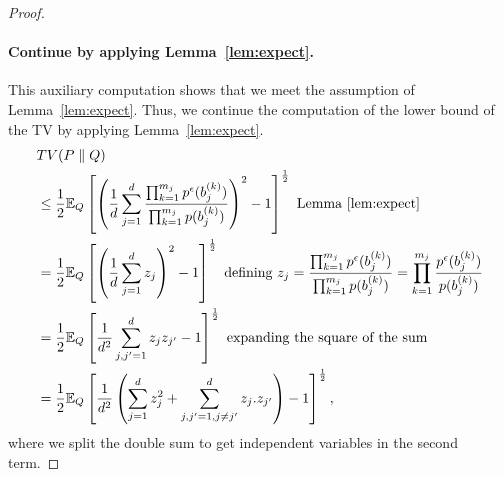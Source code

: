 \begin{proof}
\paragraph{Continue by applying Lemma~\ref{lem:expect}.} This auxiliary computation shows that we meet the assumption of Lemma~\ref{lem:expect}. Thus, we continue the computation of the lower bound of the TV by applying Lemma~\ref{lem:expect}.
\begin{align*}
     &TV (P\parallel Q)\\
     &\leq \frac{1}{2} 
            \mathbb{E}_Q 
            \left[\left(
        \frac{1}{d}
            \sum_{j=1}^d 
            \frac{\prod_{k=1}^{m_j} p^{\epsilon}(b_j^{(k)})}{\prod_{k=1}^{m_j} p(b_j^{(k)})}
            \right)^2
            -
            1
            \right]^{\frac{1}{2}}~\text{Lemma~\ref{lem:expect}}\\
     &= \frac{1}{2} 
            \mathbb{E}_Q 
            \left[\left(\frac{1}{d}\sum_{j=1}^d 
            z_j\right)^2
            -
            1
            \right]^{\frac{1}{2}}~\text{defining $z_j = \frac{\prod_{k=1}^{m_j} p^{\epsilon}(b_j^{(k)})}{\prod_{k=1}^{m_j} p(b_j^{(k)})}=\prod_{k=1}^{m_j} \frac{p^{\epsilon}(b_j^{(k)})}{p(b_j^{(k)})}$}\\
    &= \frac{1}{2} 
            \mathbb{E}_Q 
            \left[\frac{1}{d^2}\sum_{j,j'=1}^d 
            z_jz_{j'}
            -
            1
            \right]^{\frac{1}{2}}~\text{expanding the square of the sum}\\
    &= \frac{1}{2} 
            \mathbb{E}_Q 
            \left[\frac{1}{d^2}
            \left(
            \sum_{j=1}^d 
            z_j^2 + \sum_{j,j'=1, j\neq j'}^d z_j.z_{j'}
            \right)
            -
            1
            \right]^{\frac{1}{2}},
\end{align*}
where we split the double sum to get independent variables in the second term.


\end{proof}
